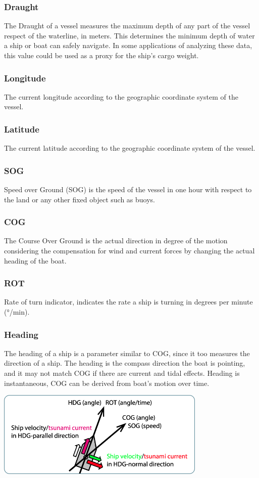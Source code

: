\subsubsection{Draught}
    The Draught of a vessel measures the maximum depth of any part of the vessel respect of the waterline, in meters. This determines the minimum depth of water a ship or boat can safely navigate. In some applications of analyzing these data, this value could be used as a proxy for the ship's cargo weight.
\subsubsection{Longitude}
    The current longitude according to the geographic coordinate system of the vessel.
\subsubsection{Latitude}
    The current latitude according to the geographic coordinate system of the vessel.
\subsubsection{SOG}
    Speed over Ground (SOG) is the speed of the vessel in one hour with respect to the land or any other fixed object such as buoys.
\subsubsection{COG}
    The Course Over Ground is the actual direction in degree of the motion considering the compensation for wind and current forces by changing the actual heading of the boat.
\subsubsection{ROT}
    Rate of turn indicator, indicates the rate a ship is turning in degrees per minute (°/min).
\subsubsection{Heading}
    The heading of a ship is a parameter similar to COG, since it too measures the direction of a ship. The heading is the compass direction the boat is pointing, and it may not match COG if there are current and tidal effects. Heading is instantaneous, COG can be derived from boat's motion over time.
    \\
    \begin{center}
    \includegraphics[width=10cm]{Images/appendices/cog-sog.png}
    \end{center}
